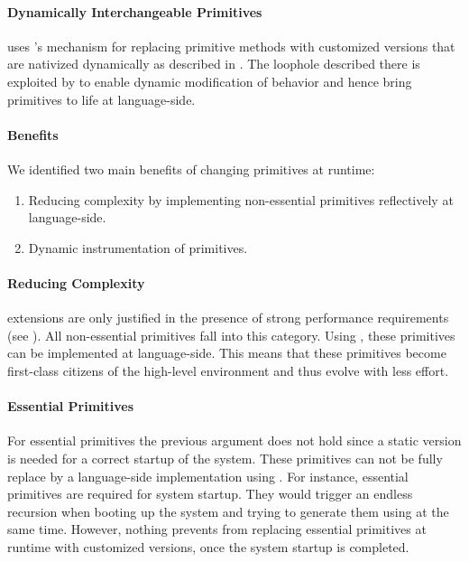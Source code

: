 \paragraph{Dynamically Interchangeable Primitives}
\WF uses \B's mechanism for replacing primitive methods with customized versions that are nativized dynamically as described in .
The loophole described there is exploited by \WF to enable dynamic modification of \VM behavior and hence bring primitives to life at language-side.


\paragraph{Benefits} 
We identified two main benefits of changing \VM primitives at runtime:

\begin{enumerate}
	\item Reducing \VM complexity by implementing non-essential primitives reflectively at language-side.
	\item Dynamic instrumentation of primitives.
\end{enumerate}

\paragraph{Reducing \VM Complexity}
\VM extensions are only justified in the presence of strong performance requirements (see ).
All non-essential primitives fall into this category.
Using \WF, these primitives can be implemented at language-side.
This means that these primitives become first-class citizens of the high-level environment and thus evolve with less effort.

\paragraph{Essential Primitives}
For essential primitives the previous argument does not hold since a static version is needed for a correct startup of the system.
These primitives can not be fully replace by a language-side implementation using \WF.
For instance, essential primitives are required for system startup.
They would trigger an endless recursion when booting up the system and trying to generate them using \WF at the same time.
However, nothing prevents from replacing essential primitives at runtime with customized versions, once the system startup is completed. 

